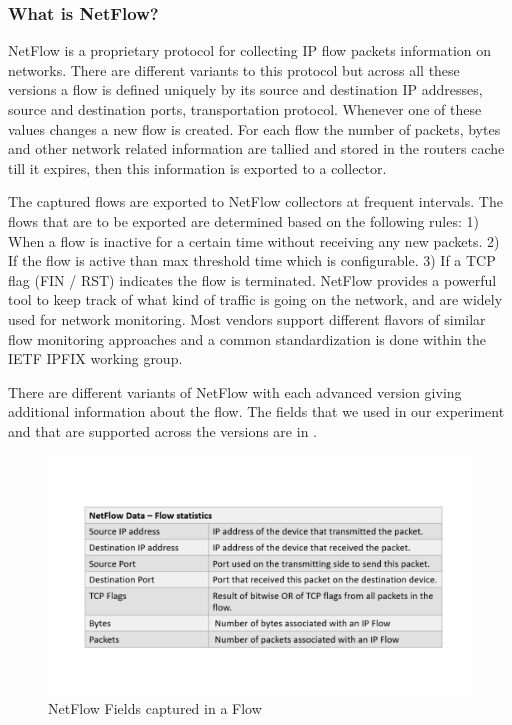 \subsubsection{What is NetFlow?}
NetFlow is a proprietary protocol for collecting IP flow packets information on networks. There are different variants to this protocol but across all these versions a flow is defined uniquely by its source and destination IP addresses, source and destination ports, transportation protocol. Whenever one of these values changes a new flow is created. For each flow the number of packets, bytes and other network related information are tallied and stored in the routers cache till it expires, then this information is exported to a collector. 

The captured flows are exported to NetFlow collectors at frequent intervals. The flows that are to be exported are determined based on the following rules: 1) When a flow is inactive for a certain time without receiving any new packets. 2) If the flow is active than max threshold time which is configurable. 3) If a TCP flag (FIN / RST) indicates the flow is terminated. NetFlow provides a powerful tool to keep track of what kind of traffic is going on the network, and are widely used for network monitoring. Most vendors support different flavors of similar flow monitoring approaches and a common standardization is done within the IETF IPFIX working group.

There are different variants of NetFlow with each advanced version giving additional information about the flow. The fields that we used in our experiment and that are supported across the versions are in .

\begin{figure}[t]
	\centerline{
	\includegraphics[trim=2cm 2cm 2cm 2cm, scale = 0.55]{netflow.pdf}}
	\caption{NetFlow Fields captured in a Flow }
\end{figure}

